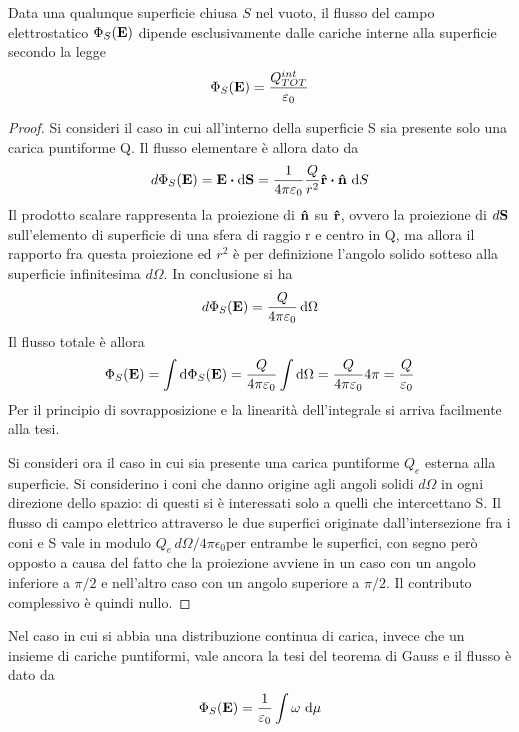 \begin{thm}
    Data una qualunque superficie chiusa $S$ nel vuoto, il flusso del campo elettrostatico $\Phi_S(\vb{E})$
    dipende esclusivamente dalle cariche interne alla superficie secondo la legge
    \[
        \Phi_S(\vb{E})=\frac{Q_{TOT}^{int}}{\varepsilon_0}
    \]
\end{thm}
\begin{proof}
    Si consideri il caso in cui all'interno della superficie S sia presente solo una carica puntiforme Q. Il flusso elementare è
    allora dato da
    \[
        d\Phi_S(\vb{E})=\vb{E}\vdot \dd{\vb{S}}=\frac{1}{4\pi\epsilon_0}\frac{Q}{r^2}\vu{r}\vdot\vu{n}\,\dd{S}
    \]
    Il prodotto scalare rappresenta la proiezione di $\vu{n}$ su $\vu{r}$, ovvero la proiezione di $d\vb{S}$ sull'elemento di
    superficie di una sfera di raggio r e centro in Q, ma allora il rapporto fra questa proiezione ed $r^2$ è per definizione
    l'angolo solido sotteso alla superficie infinitesima $d\Omega$. In conclusione si ha
    \[
        d\Phi_S(\vb{E})=\frac{Q}{4\pi\varepsilon_0}\dd{\Omega}
    \]
    Il flusso totale è allora
    \[
        \Phi_S(\vb{E})=\int \dd{\Phi_S(\vb{E})}=\frac{Q}{4\pi\varepsilon_0}\int\dd{\Omega}=\frac{Q}{4\pi\varepsilon_0}4\pi=\frac{Q}{\varepsilon_0}
    \]
    Per il principio di sovrapposizione e la linearità dell'integrale si arriva facilmente alla tesi.

    Si consideri ora il caso in cui sia presente una carica puntiforme $Q_e$ esterna alla superficie.
    Si considerino i coni che danno origine agli angoli solidi $d\Omega$ in ogni direzione dello spazio:
    di questi si è interessati solo a quelli che intercettano S. Il flusso di campo elettrico attraverso le due superfici
    originate dall'intersezione fra i coni e S vale in modulo $Q_e\,d\Omega/4\pi\epsilon_0 $per entrambe le superfici, con
    segno però opposto a causa del fatto che la proiezione avviene in un caso con un angolo inferiore a $\pi/2$ e nell'altro
    caso con un angolo superiore a $\pi/2$. Il contributo complessivo è quindi nullo.
\end{proof}

\begin{cor}
    Nel caso in cui si abbia una distribuzione continua di carica, invece che un insieme di cariche puntiformi,
    vale ancora la tesi del teorema di Gauss e il flusso è dato da
    \[
        \Phi_S(\vb{E})=\frac{1}{\varepsilon_0}\int \omega\,\dd{\mu}
    \]
\end{cor}

